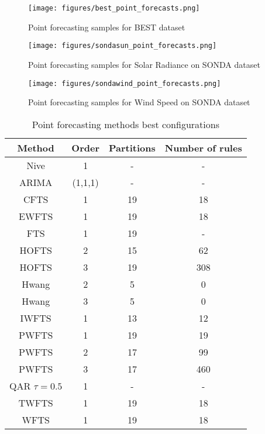 \begin{figure}
\texttt{[image: figures/best\_point\_forecasts.png]}
\caption{Point forecasting samples for BEST dataset}
\label{fig:best_point_forecasts}
\end{figure}

\begin{figure}
\texttt{[image: figures/sondasun\_point\_forecasts.png]}
\caption{Point forecasting samples for Solar Radiance on SONDA dataset}
\label{fig:sondasun_point_forecasts}
\end{figure}

\begin{figure}
\texttt{[image: figures/sondawind\_point\_forecasts.png]}
\caption{Point forecasting samples for Wind Speed on SONDA dataset}
\label{fig:sondawind_point_forecasts}
\end{figure}
 
 \begin{table}
 \centering
 \begin{tabular}{|c|c|c|c|}\hline
\textbf{Method} & \textbf{Order} & \textbf{Partitions} & \textbf{Number of rules}  \\ \hline
Nive & 1 & - & - \\ \hline
ARIMA & (1,1,1) & - & -  \\ \hline
CFTS  & 1 & 19 & 18 \\ \hline
EWFTS & 1 & 19 & 18 \\ \hline
FTS  & 1 & 19 & - \\ \hline
HOFTS & 2 & 15 & 62 \\ \hline
HOFTS & 3 & 19 & 308 \\ \hline
Hwang & 2 & 5 & 0 \\ \hline
Hwang & 3 & 5 & 0 \\ \hline
IWFTS  & 1 & 13 & 12 \\ \hline
PWFTS  & 1 & 19 & 19 \\ \hline
PWFTS  & 2 & 17 & 99 \\ \hline
PWFTS  & 3 & 17 & 460 \\ \hline
QAR $\tau=0.5$ & 1 & - & -  \\ \hline
TWFTS  & 1 & 19 & 18 \\ \hline
WFTS  & 1 & 19 & 18 \\ \hline
 \end{tabular}
\caption{Point forecasting methods best configurations }
\label{tab:point_methods}
 \end{table}
 
